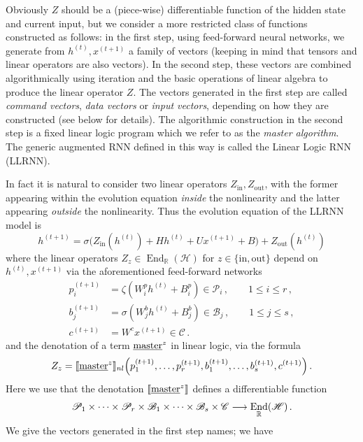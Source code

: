 \documentclass[english,letter paper,12pt,leqno]{article}
\theoremstyle{example}
\numberwithin{equation}{section}
\def\be{\begin{equation}}
\def\ee{\end{equation}}
\DeclareMathOperator{\End}{End}
\begin{document}
Obviously $Z$ should be a (piece-wise) differentiable function of the hidden state and current input, but we consider a more restricted class of functions constructed as follows: in the first step, using feed-forward neural networks, we generate from $h^{(t)}, x^{(t+1)}$ a family of vectors (keeping in mind that tensors and linear operators are also vectors). In the second step, these vectors are combined algorithmically using iteration and the basic operations of linear algebra to produce the linear operator $Z$. The vectors generated in the first step are called \emph{command vectors}, \emph{data vectors} or \emph{input vectors}, depending on how they are constructed (see below for details). The algorithmic construction in the second step is a fixed linear logic program which we refer to as the \emph{master algorithm}. The generic augmented RNN defined in this way is called the Linear Logic RNN (LLRNN).

In fact it is natural to consider two linear operators $Z_{\operatorname{in}}, Z_{\operatorname{out}}$, with the former appearing within the evolution equation \emph{inside} the nonlinearity and the latter appearing \emph{outside} the nonlinearity. Thus the evolution equation of the LLRNN model is
\be\label{eq:masterh}
h^{(t+1)} = \sigma\Big( Z_{\mathrm{in}}(h^{(t)}) + H h^{(t)} + U x^{(t+1)} + B\Big) + Z_{\mathrm{out}}(h^{(t)})
\ee
where the linear operators $Z_z \in \End_{\mathbb{R}}(\mathscr{H})$ for $z \in \{\mathrm{in},\mathrm{out}\}$ depend on $h^{(t)}, x^{(t+1)}$ via the aforementioned feed-forward networks
\begin{align*}
p_i^{(t+1)} &= \zeta( W^p_i h^{(t)} + B^p_i ) \in \mathscr{P}_i\,, \qquad 1 \le i \le r\,,\\
b_j^{(t+1)} &= \sigma( W^b_j h^{(t)} + B^b_j ) \in \mathscr{B}_j\,, \qquad 1 \le j \le s\,,\\
c^{(t+1)} &=  W^c x^{(t+1)} \in \mathscr{C}\,.
\end{align*}
and the denotation of a term $\underline{\textup{master}}^z$ in linear logic, via the formula
\be\label{eq:masterz}
Z_z = \den{\underline{\mathrm{master}}^z}_{nl}\Big( p_1^{(t+1)}, \ldots, p_r^{(t+1)}, b_1^{(t+1)}, \ldots, b_s^{(t+1)}, c^{(t+1)}\Big)\,.
\ee
Here we use that the denotation $\llbracket \underline{\textup{master}}^z \rrbracket$ defines a differentiable function
\be
\mathscr{P}_1 \times \cdots \times \mathscr{P}_r \times \mathscr{B}_1 \times \cdots \times \mathscr{B}_s \times \mathscr{C} \lto \End_{\mathbb{R}}(\mathscr{H})\,.
\ee
We give the vectors generated in the first step names; we have
\end{document}
